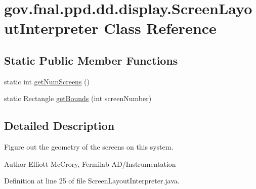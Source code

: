\hypertarget{classgov_1_1fnal_1_1ppd_1_1dd_1_1display_1_1ScreenLayoutInterpreter}{\section{gov.\-fnal.\-ppd.\-dd.\-display.\-Screen\-Layout\-Interpreter Class Reference}
\label{classgov_1_1fnal_1_1ppd_1_1dd_1_1display_1_1ScreenLayoutInterpreter}
}
\subsection*{Static Public Member Functions}
\begin{DoxyCompactItemize}
\item 
static int \hyperlink{classgov_1_1fnal_1_1ppd_1_1dd_1_1display_1_1ScreenLayoutInterpreter_a28bf32f519c6365ebf15a0d8d539595f}{get\-Num\-Screens} ()
\item 
static Rectangle \hyperlink{classgov_1_1fnal_1_1ppd_1_1dd_1_1display_1_1ScreenLayoutInterpreter_a1202af9585c07cffdc214d0674d30e35}{get\-Bounds} (int screen\-Number)
\end{DoxyCompactItemize}


\subsection{Detailed Description}
Figure out the geometry of the screens on this system.

\begin{DoxyAuthor}{Author}
Elliott Mc\-Crory, Fermilab A\-D/\-Instrumentation 
\end{DoxyAuthor}


Definition at line 25 of file Screen\-Layout\-Interpreter.\-java.




